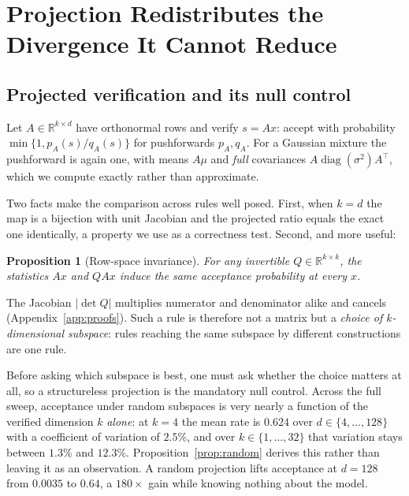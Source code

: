 \documentclass[10pt]{article}
\newtheorem{proposition}{Proposition}
\newcommand{\R}{\mathbb{R}}
\newcommand{\dd}{d}
\newcommand{\kk}{k}
\begin{document}
\section{Projection Redistributes the Divergence It Cannot Reduce}
\label{sec:conservation}

\subsection{Projected verification and its null control}

Let $A \in \R^{\kk \times \dd}$ have orthonormal rows and verify $s = Ax$: accept with probability
$\min\{1, p_A(s)/q_A(s)\}$ for pushforwards $p_A, q_A$. For a Gaussian mixture the pushforward is
again one, with means $A\mu$ and \emph{full} covariances $A\operatorname{diag}(\sigma^2)A^\top$, which
we compute exactly rather than approximate.

Two facts make the comparison across rules well posed. First, when $\kk = \dd$ the map is a bijection
with unit Jacobian and the projected ratio equals the exact one identically, a property we use as a
correctness test. Second, and more useful:

\begin{proposition}[Row-space invariance]
\label{prop:rowspace}
For any invertible $Q \in \R^{\kk \times \kk}$, the statistics $Ax$ and $QAx$ induce the same
acceptance probability at every $x$.
\end{proposition}

The Jacobian $|\det Q|$ multiplies numerator and denominator alike and cancels
(Appendix~\ref{app:proofs}). Such a rule is therefore not a matrix but a \emph{choice of
$\kk$-dimensional subspace}: rules reaching the same subspace by different constructions are one rule.

Before asking which subspace is best, one must ask whether the choice matters at all, so a
structureless projection is the mandatory null control. Across the full sweep, acceptance under
random subspaces is very nearly a function of the verified dimension $\kk$ \emph{alone}: at $\kk=4$
the mean rate is $0.624$ over $\dd \in \{4,\dots,128\}$ with a coefficient of variation of $2.5\%$,
and over $\kk \in \{1,\dots,32\}$ that variation stays between $1.3\%$ and $12.3\%$.
Proposition~\ref{prop:random} derives this rather than leaving it as an observation. A random
projection lifts acceptance at $\dd{=}128$ from $0.0035$ to $0.64$, a $180\times$ gain while knowing
nothing about the model.
\end{document}
